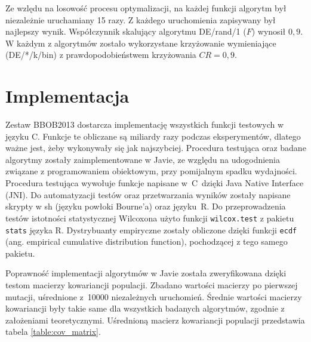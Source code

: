 \documentclass[a4paper,onecolumn,oneside,11pt,wide,floatssmall]{mwrep}
\theoremstyle{definition}
\theoremstyle{plain}%
\theoremstyle{remark}
\begin{document}
Ze wzlędu na losowość procesu optymalizacji, na każdej funkcji algorytm był niezależnie uruchamiany 15 razy.
Z każdego uruchomienia zapisywany był 
najlepszy wynik. Współczynnik skalujący algorytmu DE/rand/1 ($F$) wynosił $0,9$. 
W każdym z algorytmów zostało wykorzystane krzyżowanie wymieniające (DE/*/k/bin) z
prawdopodobieństwem krzyżowania $CR = 0,9$.

\section{Implementacja}

Zestaw BBOB2013 dostarcza implementację wszystkich funkcji testowych w języku C. Funkcje te obliczane
są miliardy razy podczas eksperymentów, dlatego ważne jest, żeby wykonywały się jak najszybciej.
Procedura testująca oraz badane algorytmy zostały zaimplementowane w 
Javie, ze względu na udogodnienia związane z programowaniem obiektowym, przy pomijalnym spadku 
wydajności. Procedura testująca wywołuje funkcje napisane w~C~dzięki Java Native Interface (JNI).
Do automatyzacji testów oraz przetwarzania wyników zostały napisane skrypty w sh 
(języku powłoki Bourne'a) oraz języku~R. Do przeprowadzenia testów istotności statystycznej Wilcoxona 
użyto funkcji \texttt{wilcox.test} z pakietu \texttt{stats} języka R. Dystrybuanty empiryczne
zostały obliczone dzięki funkcji \texttt{ecdf} (ang. empirical cumulative distribution function),
pochodzącej z tego samego pakietu.

Poprawność implementacji algorytmów w Javie została zweryfikowana dzięki testom macierzy kowariancji
populacji. Zbadano wartości macierzy po pierwszej mutacji, uśrednione z~10000 niezależnych uruchomień. 
Średnie wartości macierzy kowariancji były takie same dla wszystkich badanych algorytmów, zgodnie z 
założeniami teoretycznymi. Uśrednioną macierz kowariancji populacji przedstawia tabela 
\ref{table:cov_matrix}. 
\end{document}
